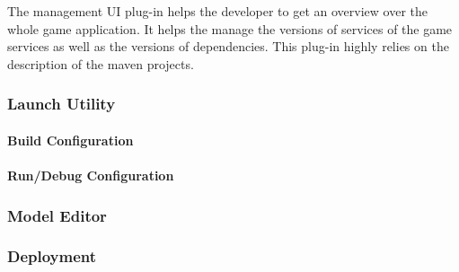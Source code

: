 The management UI plug-in helps the developer to get an overview over the whole
game application. It helps the manage the versions of services of the game
services as well as the versions of dependencies. This plug-in highly relies on
the description of the maven projects.

\subsubsection{Launch Utility}

\paragraph{Build Configuration}

\paragraph{Run/Debug Configuration}

\subsubsection{Model Editor}

\subsubsection{Deployment}
